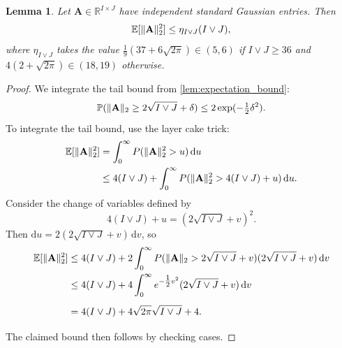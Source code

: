 \documentclass[twoside]{article}
\newcommand{\mA}{\mathbf{A}}
\newcommand{\E}{\mathbb{E}}
\renewcommand{\P}{\mathbb{P}}
\renewcommand{\P}{\ensuremath{P}}
\newcommand{\R}{\mathbb{R}}
\newcommand{\sd}[1]{\mathrm{d} #1}         %
\newcommand{\isd}[1]{\, \mathrm{d} #1}     %
\DeclarePairedDelimiter\norm{\|}{\|}             %
\theoremstyle{theoremstyle}
\newtheorem{lemma}[theorem]{Lemma}
\begin{document}
\begin{lemma} \label{lem:expectation_squared_bound_update}
    Let $\mA \in \R^{I \times J}$ have independent standard Gaussian entries.
    Then
    \begin{equation}
        \E[\norm{\mA}^2_2]
        \le \eta_{I \lor J} (I \lor J),
    \end{equation}
    where $\eta_{I \lor J}$ takes the value $\tfrac19(37+6\sqrt{2\pi}) \in (5,6)$ if $I\lor J\ge 36$ and $4(2+\sqrt{2\pi}) \in (18,19)$ otherwise.
\end{lemma}
\begin{proof}
    We integrate the tail bound from \cref{lem:expectation_bound}:
    \begin{equation}
        \mathbb{P}(\norm{\mA}_2 \ge 2 \sqrt{I \lor J} + \delta) \le 2 \exp(-\tfrac1{2} \delta^2).
    \end{equation}
     To integrate the tail bound, use the layer cake trick:
    \begin{align}
        \E[\norm{\mA}^2_2]
        &= \int_0^\infty \P(\norm{\mA}^2_2 > u) \isd u \\
        &\le 4(I \lor J) + \int_0^\infty \P(\norm{\mA}^2_2 > 4(I \lor J) + u) \isd u.
    \end{align}
    Consider the change of variables defined by
    \begin{equation}
        4(I \lor J) + u = (2 \sqrt{I \lor J} + v)^2.
    \end{equation}
    Then
    $\sd u = 2( 2\sqrt{I \lor J} + v) \isd v$,
    so
    \begin{align}
        \E[\norm{\mA}^2_2]
        &\le
            4(I \lor J)
            + 2\int_0^\infty \P(\norm{\mA}_2 > 2 \sqrt{I \lor J} + v) (2 \sqrt{I \lor J} + v) \isd v \\
        &\le\vphantom{\int_0^\infty}
            4(I \lor J)
            + 4\int_0^\infty e^{-\tfrac12 v^2} (2 \sqrt{I \lor J} + v) \isd v \\
        &=\vphantom{\int_0^\infty}
            4(I \lor J)
            + 4 \sqrt{2\pi} \sqrt{I \lor J} + 4.
    \end{align}
The claimed bound then follows by checking cases.
\end{proof}
\end{document}

